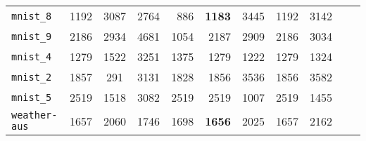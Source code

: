 \begin{tabular}{lccrrrrrrrr}
\texttt{mnist\_8} & 1192 & 3087 & 2764 & 886 & \textbf{1183} & 3445 & 1192 & 3142\\
\texttt{mnist\_9} & 2186 & 2934 & 4681 & 1054 & 2187 & 2909 & 2186 & 3034\\
\texttt{mnist\_4} & 1279 & 1522 & 3251 & 1375 & 1279 & 1222 & 1279 & 1324\\
\texttt{mnist\_2} & 1857 & 291 & 3131 & 1828 & 1856 & 3536 & 1856 & 3582\\
\texttt{mnist\_5} & 2519 & 1518 & 3082 & 2519 & 2519 & 1007 & 2519 & 1455\\
\texttt{weather-aus} & 1657 & 2060 & 1746 & 1698 & \textbf{1656} & 2025 & 1657 & 2162\\
\bottomrule
\end{tabular}
